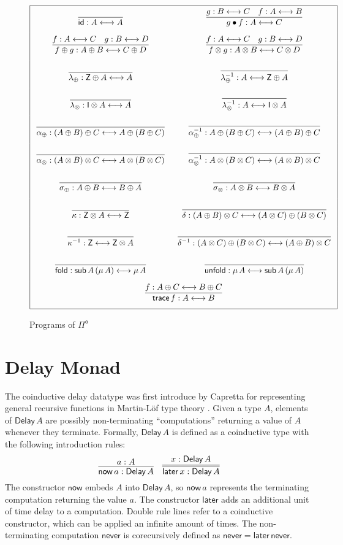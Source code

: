 \documentclass[runningheads,a4paper]{llncs}
\newcommand{\Pio}{\ensuremath{\mathsf{\Pi}^{\mathsf{o}}}}
\newcommand{\id}{\mathsf{id}}
\newcommand{\lr}{\longleftrightarrow}
\newcommand{\fold}{\mathsf{fold}}
\newcommand{\unfold}{\mathsf{unfold}}
\newcommand{\sub}{\mathsf{sub}}
\newcommand{\trace}{\ensuremath{\mathsf{trace}}}
\newcommand{\Z}{\mathsf{Z}}
\newcommand{\I}{\mathsf{I}}
\newcommand{\Delay}{\ensuremath{\mathsf{Delay}\,}}
\newcommand{\now}{\mathsf{now}}
\newcommand{\later}{\mathsf{later}}
\newcommand{\never}{\mathsf{never}}
\begin{document}
\begin{figure}
\[
\arraycolsep=8pt\def\arraystretch{2.8}
\begin{array}{|cc|}
\hline
\infer{\id : A \lr A}{}
& \infer{g \bullet f : A \lr C}{g : B \lr C & f : A \lr B} \\
\infer{f \oplus g : A \oplus B \lr C \oplus D}{f : A \lr C & g : B \lr D} 
& \infer{f \otimes g : A \otimes B \lr C \otimes D}{f : A \lr C & g : B \lr D} \\
\infer{\lambda_{\oplus} : \Z \oplus A \lr A}{}
& \infer{\lambda_{\oplus}^{-1} : A \lr \Z \oplus A}{} \\
\infer{\lambda_{\otimes} : \I \otimes A \lr A}{}
& \infer{\lambda_{\otimes}^{-1} : A \lr \I \otimes A}{} \\
\infer{\alpha_{\oplus} : (A \oplus B) \oplus C \lr A \oplus (B \oplus C)}{}
& \infer{\alpha_{\oplus}^{-1} : A \oplus (B \oplus C) \lr (A \oplus B) \oplus C}{} \\
\infer{\alpha_{\otimes} : (A \otimes B) \otimes C \lr A \otimes (B \otimes C)}{}
& \infer{\alpha_{\otimes}^{-1} : A \otimes (B \otimes C) \lr (A \otimes B) \otimes C}{} \\
\infer{\sigma_{\oplus} : A \oplus B \lr B \oplus A}{}
& \infer{\sigma_{\otimes} : A \otimes B \lr B \otimes A}{} \\
\infer{\kappa : \Z \otimes A \lr \Z}{} 
& \infer{\delta : (A \oplus B) \otimes C \lr (A \otimes C) \oplus (B \otimes C)}{} \\
\infer{\kappa^{-1} : \Z \lr \Z \otimes A}{}
& \infer{\delta^{-1} : (A \otimes C) \oplus (B \otimes C)  \lr (A \oplus B) \otimes C}{} \\
\infer{\fold : \sub \, A \, (\mu \,A) \lr \mu \,A}{} 
& \infer{\unfold : \mu\,A \lr \sub \, A \, (\mu \,A)}{} \\
\multicolumn{2}{|c|}{\infer{\trace \,f: A \lr B}{f : A \oplus C \lr B \oplus C}} \\
\hline
\end{array}
\]
\caption{Programs of \Pio}
\label{fig:programs}
\end{figure}

\section{Delay Monad}\label{sec:delay}

The coinductive delay datatype was first introduce by Capretta for
representing general recursive functions in Martin-L\"of type theory
\cite{Capretta05}.  Given a type $A$, elements of $\Delay A$ are
possibly non-terminating ``computations'' returning a value of $A$
whenever they terminate. Formally, $\Delay A$ is defined as a
coinductive type with the following introduction rules:
\[
\infer{\now\,a : \Delay A}{a : A}
\quad
\infer={\later\,x : \Delay A}{x : \Delay A}
\]
The constructor $\now$ embeds $A$ into $\Delay A$, so $\now\,a$
represents the terminating computation returning the value $a$. The
constructor $\later$ adds an additional unit of time delay to a
computation. Double rule lines refer to a coinductive constructor,
which can be applied an infinite amount of times.
The non-terminating computation $\never$
is corecursively defined as $\never = \later \,\never$.
\end{document}
